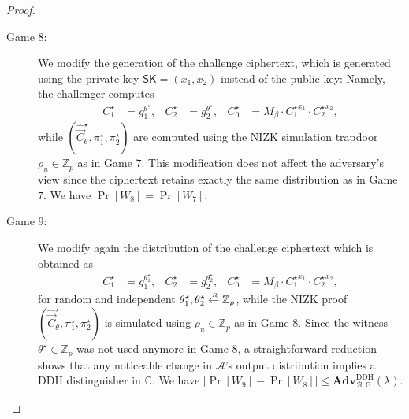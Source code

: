 \documentclass[10pt]{llncs}
\newcommand{\A}{\mathcal{A}}
\newcommand{\B}{\mathcal{B}}
\newcommand{\G}{\mathbb{G}}
\newcommand{\Z}{\mathbb{Z}}
\newcommand{\SK}{\mathsf{SK}}
\newcommand{\sample}{\stackrel{{\scriptscriptstyle \mkern4mu R}}{\gets}}
\begin{document}
\begin{proof}
\begin{description}
  \item[\textsf{Game} $8$:]  We modify the generation of the challenge ciphertext, which is generated using the private key $\SK=(x_1,x_2)$ instead
    of the public key: Namely, the challenger computes 
    \begin{align*}
      C_1^\star &= g_1^{\theta^\star}, & C_2^\star &= g_2^{\theta^\star},    &  C_0^\star &= M_{\beta} \cdot {C_1^\star}^{x_1} \cdot  {C_2^\star}^{x_2} , 
    \end{align*} 
    while $(\hat{\vec{C}}_\theta^\star,\pi_1^\star,\pi_2^\star)$ are computed using the NIZK simulation trapdoor $\rho_u \in \Z_p$ as in Game $7$. 
    This modification does not affect the adversary's view since the ciphertext retains exactly the same distribution as in Game $7$. 
    We have $\Pr[W_8]=\Pr[W_7]$.  \smallskip \smallskip

  \item[\textsf{Game} $9$:] We modify again the distribution of the challenge ciphertext which is obtained as 
    \begin{align*}
      C_1^\star &= g_1^{\theta_1^\star}, & C_2^\star &= g_2^{\theta_2^\star},    &  C_0^\star &= M_{\beta} \cdot {C_1^\star}^{x_1} \cdot  {C_2^\star}^{x_2} , 
    \end{align*} 
    for random and independent $\theta_1^\star,\theta_2^\star \sample \Z_p$, 
    while the NIZK proof $(\hat{\vec{C}}_\theta^\star,\pi_1^\star,\pi_2^\star)$ is simulated using $\rho_u \in \Z_p$ as in Game $8$.  Since 
    the witness $\theta^\star \in \Z_p$ was not used anymore in Game $8$, a straightforward reduction shows that  any noticeable change in $\A$'s output distribution implies a DDH distinguisher in $\G$. We have 
    $|\Pr[W_9]-\Pr[W_8]| \leq   \mathbf{Adv}_{\B,\G}^{\mathrm{DDH}}(\lambda)$.  \smallskip \smallskip

    

  \end{description}


\end{proof}
\end{document}
